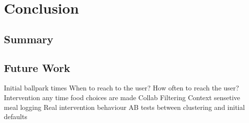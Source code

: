 
\chapter{Conclusion}\label{chapter:conclusion}

\section{Summary}
\section{Future Work}
Initial ballpark times
When to reach to the user?
How often to reach the user?
Intervention any time food choices are made
Collab Filtering
Context sensetive meal logging
Real intervention behaviour
AB tests between clustering and initial defaults
